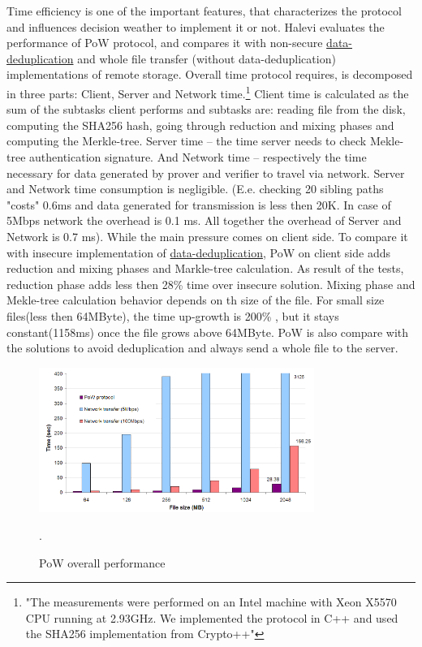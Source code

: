 \documentclass[12pt]{article}
\begin{document}
Time efficiency is one of the important features, that characterizes the protocol and influences decision weather to implement it or not. Halevi evaluates the performance of PoW protocol, and  compares it with non-secure  \hyperref [sub:Deduplication]{data-deduplication} and whole file transfer (without data-deduplication) implementations of remote storage. Overall time protocol requires, is decomposed in three parts: Client, Server and Network time.\footnote{"The measurements were performed on an Intel machine with Xeon X5570 CPU running at 2.93GHz. We implemented the protocol in C++ and used the SHA256 implementation from Crypto++"} Client time is calculated as the sum of the subtasks client performs and subtasks are: reading file from the disk, computing the SHA256 hash, going through reduction and mixing phases and  computing the Merkle-tree. Server time -- the time server needs to check Mekle-tree authentication signature. And Network time -- respectively the time necessary for data generated by prover and verifier to travel via network. Server and Network time consumption is negligible. (E.e. checking 20 sibling paths "costs" 0.6ms and data generated for transmission  is less then 20K. In case of 5Mbps network the overhead is 0.1 ms. All together the overhead of Server and Network is 0.7 ms). While the main pressure comes on client side. To  compare it with insecure implementation of \hyperref [sub:Deduplication]{data-deduplication}, PoW on client side adds reduction and mixing phases and Markle-tree calculation. As result of the tests, reduction phase adds less then 28\% time over insecure solution. Mixing phase and Mekle-tree calculation behavior depends on th size of the file. For small size files(less then 64MByte), the time up-growth is 200\% , but it stays  constant(1158ms) once the file grows above 64MByte. PoW is also  compare with the solutions to avoid deduplication and always send a whole file to the server.


\begin{figure}[ht] 
\begin{center}
\includegraphics[width=0.8\textwidth]{PoWgraph}
\caption{PoW overall performance}
\label{fig:PoWgraph} .
\end{center}
\end{figure}
\end{document}
